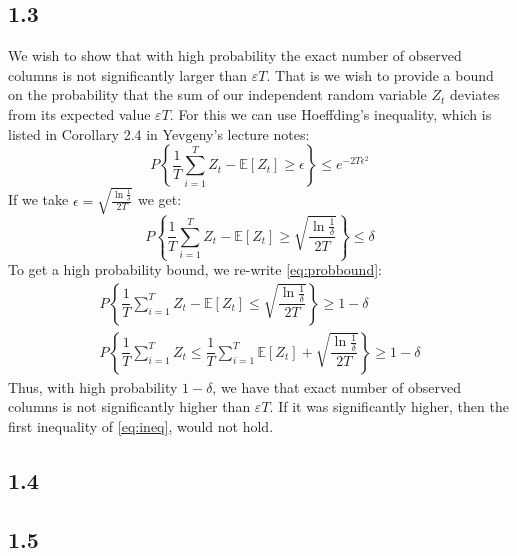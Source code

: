 \documentclass{article}
\begin{document}
\subsection{1.3}
We wish to show that with high probability the exact number of observed columns is not significantly larger than $\varepsilon T $. That is we wish to provide a bound on the probability that the sum of our independent random variable $Z_t$ deviates from its expected value $\varepsilon T$. For this we can use Hoeffding's inequality, which is listed in Corollary 2.4 in Yevgeny's lecture notes:
\begin{equation}
P \left\lbrace \dfrac{1}{T} \sum\limits_{i=1}^T Z_t - \mathbb{E}[Z_t] \geq \epsilon \right \rbrace \leq e^{-2 T \epsilon^2}
\end{equation}
If we take $\epsilon = \sqrt{\frac{\ln \frac{1}{\delta}}{2T}}$ we get:
\begin{equation}
\label{eq:probbound}
P \left\lbrace \dfrac{1}{T} \sum\limits_{i=1}^T Z_t - \mathbb{E}[Z_t] \geq \sqrt{\dfrac{\ln \frac{1}{\delta}}{2T}} \right \rbrace \leq \delta
\end{equation}
To get a high probability bound, we re-write \eqref{eq:probbound}:
\begin{align}
P \left\lbrace \dfrac{1}{T} \sum\limits_{i=1}^T Z_t - \mathbb{E}[Z_t] \leq \sqrt{\dfrac{\ln \frac{1}{\delta}}{2T}} \right \rbrace \geq 1- \delta \\
P \left\lbrace \dfrac{1}{T} \sum\limits_{i=1}^T Z_t \leq  \dfrac{1}{T} \sum\limits_{i=1}^T \mathbb{E}[Z_t] + \sqrt{\dfrac{\ln \frac{1}{\delta}}{2T}} \right \rbrace \geq 1- \delta
\label{eq:ineq}
\end{align}
Thus, with high probability $1 - \delta$, we have that exact number of observed columns is not significantly higher than $\varepsilon T$. If it was significantly higher, then the first inequality of \eqref{eq:ineq}, would not hold.
\subsection{1.4}
\subsection{1.5}
\end{document}
